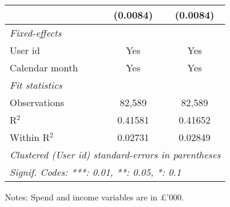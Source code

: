 \begin{table}[htbp]
\begin{threeparttable}[b]
\begin{tabular}{lcc}
                             & (0.0084)        & (0.0084)\\   
         \midrule
         \emph{Fixed-effects}\\
         User id             & Yes             & Yes\\  
         Calendar month      & Yes             & Yes\\  
         \midrule
         \emph{Fit statistics}\\
         Observations        & 82,589          & 82,589\\  
         R$^2$               & 0.41581         & 0.41652\\  
         Within R$^2$        & 0.02731         & 0.02849\\  
         \midrule \midrule
         \multicolumn{3}{l}{\emph{Clustered (User id) standard-errors in parentheses}}\\
         \multicolumn{3}{l}{\emph{Signif. Codes: ***: 0.01, **: 0.05, *: 0.1}}\\
      \end{tabular}
      
      \begin{tablenotes}\footnotesize
         \item Notes: Spend and income variables are in \pounds'000.
      \end{tablenotes}
   \end{threeparttable}
\end{table}


